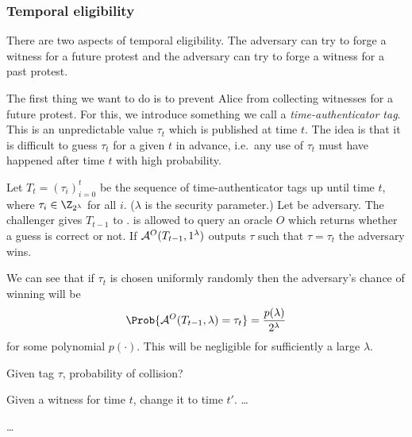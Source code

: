 \subsubsection{Temporal eligibility}

There are two aspects of temporal eligibility.
The adversary can try to forge a witness for a future protest and the adversary 
can try to forge a witness for a past protest.

The first thing we want to do is to prevent Alice from collecting witnesses for 
a future protest.
For this, we introduce something we call a \emph{time-authenticator tag}.
This is an unpredictable value \(\tau_t\) which is published at time \(t\).
The idea is that it is difficult to guess \(\tau_t\) for a given \(t\) in 
advance, i.e.\ any use of \(\tau_t\) must have happened after time \(t\) with 
high probability.

\begin{definition}
  Let \(T_t = (\tau_i)_{i=0}^{t}\) be the sequence of time-authenticator tags up 
  until time \(t\), where \(\tau_i\in \Z_{2^\lambda}\) for all \(i\).
  (\(\lambda\) is the security parameter.)
  Let \A be  adversary.
  The challenger gives \(T_{t-1}\) to \A.
  \A is allowed to query an oracle \(O\) which returns whether a guess is 
  correct or not.
  If \(\mathcal{A}^O(T_{t-1},1^\lambda)\) outputs \(\tau\) such that \(\tau = \tau_t\) 
  the adversary wins.
\end{definition}

We can see that if \(\tau_t\) is chosen uniformly randomly then the adversary's 
chance of winning will be
\begin{equation}
  \label{SuccessOfPrediction}
  \Prob{%
    \A^O(T_{t-1}, \lambda) = \tau_t
  } = \frac{p(\lambda)}{2^\lambda}
\end{equation}
for some polynomial \(p(\cdot)\).
This will be negligible for sufficiently a large \(\lambda\).

\begin{definition}[Collision]
  Given tag \(\tau\), probability of collision?
\end{definition}

\begin{definition}
  Given a witness for time \(t\), change it to time \(t'\).
  \dots
\end{definition}

\begin{definition}
  \dots
\end{definition}


